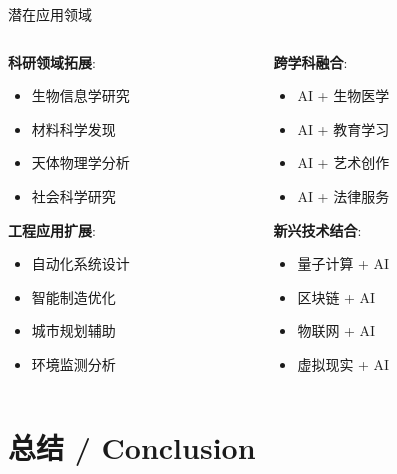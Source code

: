 \documentclass[aspectratio=169]{beamer}
\begin{document}
\begin{frame}{潜在应用领域}
\begin{columns}
\begin{column}{0.5\textwidth}
\textbf{科研领域拓展}:
\begin{itemize}
    \item 生物信息学研究
    \item 材料科学发现
    \item 天体物理学分析
    \item 社会科学研究
\end{itemize}

\textbf{工程应用扩展}:
\begin{itemize}
    \item 自动化系统设计
    \item 智能制造优化
    \item 城市规划辅助
    \item 环境监测分析
\end{itemize}
\end{column}
\begin{column}{0.5\textwidth}
\textbf{跨学科融合}:
\begin{itemize}
    \item AI + 生物医学
    \item AI + 教育学习  
    \item AI + 艺术创作
    \item AI + 法律服务
\end{itemize}

\textbf{新兴技术结合}:
\begin{itemize}
    \item 量子计算 + AI
    \item 区块链 + AI
    \item 物联网 + AI
    \item 虚拟现实 + AI
\end{itemize}
\end{column}
\end{columns}
\end{frame}

\section{总结 / Conclusion}
\end{document}
